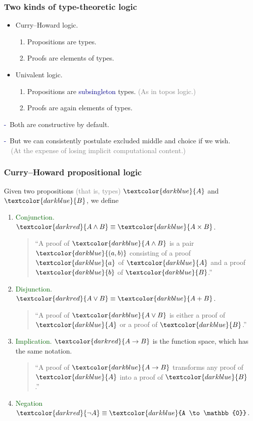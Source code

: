 \documentclass[aspectratio=169]{beamer}
\newcommand{\eqq}{\equiv}
\newcommand{\da}{\db{-}~}
\newcommand{\db}{\textcolor{darkblue}}
\newcommand{\dg}{\textcolor{darkgreen}}
\newcommand{\grey}{\textcolor{grey}}
\newcommand{\dr}{\textcolor{darkred}}
\newcommand{\m}[1]{$\db{#1}$}
\newcommand{\mm}[1]{${#1}$}
\begin{document}
\begin{frame}
  \frametitle{Two kinds of type-theoretic logic}

  \begin{itemize}
  \vfill \item Curry--Howard logic.

  \begin{enumerate}
  \item Propositions are types.
  \item Proofs are elements of types.
  \end{enumerate}

  \vfill \item Univalent logic.
  \begin{enumerate}
  \item Propositions are \db{subsingleton} types.
  \grey{(As in topos logic.)}

  \item Proofs are again elements of types.
  \end{enumerate}
  \end{itemize}

\vfill \da Both are constructive by default.

\vfill \da But we can consistently postulate excluded middle and choice if we wish. \\
\grey{~~(At the expense of losing implicit computational content.)}

\end{frame}

\begin{frame}
  \frametitle{Curry--Howard propositional logic}

Given two propositions \grey{(that is, types)} \m{A} and \m{B}, we define
\begin{enumerate}
\vfill \item \dg{Conjunction.} \mm{\dr{A \wedge B} \eqq \db{A \times B}}. \\[1ex]
  \begin{quote}
``A proof of \m{A\wedge B} is a pair \m{(a,b)} consisting of a proof \m{a} of \m{A} and a proof \m{b} of \m{B}.''
  \end{quote}
\vfill \item \dg{Disjunction.} \mm{\dr{A \vee B} \eqq \db{A + B}}. \\[1ex]
  \begin{quote}
``A proof of \m{A\vee B} is either a proof of \m{A} or a proof of \m{B}.''
  \end{quote}
\vfill \item \dg{Implication.} \mm{\dr{A \to B}} is the function space, which has the same notation. \\[1ex]
  \begin{quote}
``A proof of \m{A \to B} transforms any proof of \m{A} into a proof of \m{B}.''
  \end{quote}

\vfill \item \dg{Negation} \mm{\dr{\neg A} \eqq \db{A \to \mathbb{0}}}. \\[1ex]
\end{enumerate}
\end{frame}
\end{document}
